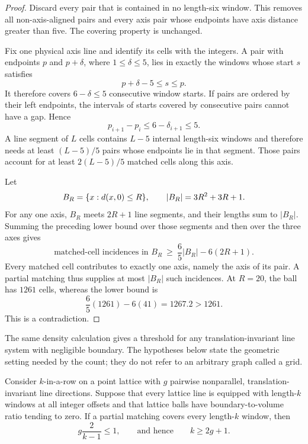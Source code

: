 \begin{proof}
Discard every pair that is contained in no length-six window.  This removes
all non-axis-aligned pairs and every axis pair whose endpoints have axis
distance greater than five.  The covering property is unchanged.

Fix one physical axis line and identify its cells with the integers.  A pair
with endpoints $p$ and $p+\delta$, where $1\leq\delta\leq5$, lies in exactly
the windows whose start $s$ satisfies
\[
 p+\delta-5\leq s\leq p.
\]
It therefore covers $6-\delta\leq5$ consecutive window starts.  If pairs are
ordered by their left endpoints, the intervals of starts covered by
consecutive pairs cannot have a gap.  Hence
\[
 p_{i+1}-p_i\leq 6-\delta_{i+1}\leq5.
\]
A line segment of $L$ cells contains $L-5$ internal length-six windows and
therefore needs at least $(L-5)/5$ pairs whose endpoints lie in that segment.
Those pairs account for at least $2(L-5)/5$ matched cells along this axis.

Let
\[
 B_R=\{x:d(x,0)\leq R\},
 \qquad |B_R|=3R^2+3R+1.
\]
For any one axis, $B_R$ meets $2R+1$ line segments, and their lengths sum to
$|B_R|$.  Summing the preceding lower bound over those segments and then over
the three axes gives
\[
 \text{matched-cell incidences in }B_R
 \ \geq\ \frac65|B_R|-6(2R+1).
\]
Every matched cell contributes to exactly one axis, namely the axis of its
pair.  A partial matching thus supplies at most $|B_R|$ such incidences.  At
$R=20$, the ball has $1261$ cells, whereas the lower bound is
\[
 \frac65(1261)-6(41)=1267.2>1261.
\]
This is a contradiction.
\end{proof}

The same density calculation gives a threshold for any translation-invariant
line system with negligible boundary.  The hypotheses below state the
geometric setting needed by the count; they do not refer to an arbitrary graph
called a grid.

\begin{corollary}
\label{cor:T8.1}
Consider $k$-in-a-row on a point lattice with $g$ pairwise nonparallel,
translation-invariant line directions.  Suppose that every lattice line is
equipped with length-$k$ windows at all integer offsets and that lattice balls
have boundary-to-volume ratio tending to zero.  If a partial matching covers
every length-$k$ window, then
\[
 g\frac{2}{k-1}\leq1,
 \qquad\text{and hence}\qquad k\geq2g+1.
\]
\end{corollary}


